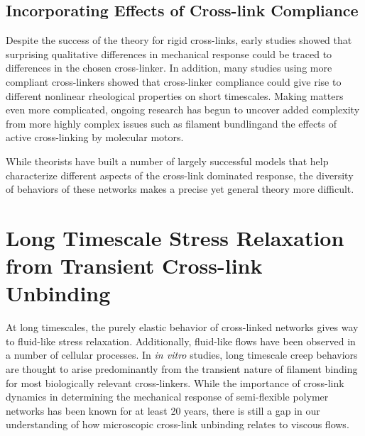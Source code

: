 \subsection{Incorporating Effects of Cross-link Compliance}

Despite the success of the theory for rigid cross-links, early studies showed that surprising qualitative differences in mechanical response could be traced to differences in the chosen cross-linker\cite{rheo_crosslinkcompare,rheo_crosslinkreview}.  In addition, many studies using more compliant cross-linkers showed that cross-linker compliance could give rise to different nonlinear rheological properties on short timescales\cite{rheo_crosslink_nonlin1,rheo_crosslink_nonlin2,rheo_crosslink_nonlin3,rheo_crosslink_notactin}. Making matters even more complicated, ongoing research has begun to uncover added complexity from more highly complex issues such as filament bundling\cite{theo_crosslinkslip2,model_massive}and the effects of active cross-linking by molecular motors\cite{rheo_active}.

While theorists have built a number of largely successful models that help characterize different aspects of the cross-link dominated response\cite{theo_nonaffine2,theo_floppy,theo_crosslinknonlinear}, the diversity of behaviors of these networks makes a precise yet general theory more difficult.

\section{Long Timescale Stress Relaxation from Transient Cross-link Unbinding}

At long timescales, the purely elastic behavior of cross-linked networks gives way to fluid-like stress relaxation. Additionally, fluid-like flows have been observed in a number of cellular processes\cite{cellmech_flows,cellmech_flows2,cellmech_flows3,rheo_fluid,rheo_fluid2,cell_rheo_exp}.  In {\em in vitro} studies, long timescale creep behaviors are thought to arise predominantly from the transient nature of filament binding for most biologically relevant cross-linkers\cite{rheo_crosslinkslip1,rheo_crosslinkslip2,rheo_crosslinkslip3,rheo_nonaffine}.  While the importance of cross-link dynamics in determining the mechanical response of semi-flexible polymer networks has been known for at least 20 years\cite{rheo_crosslinksmatter}, there is still a gap in our understanding of how microscopic cross-link unbinding relates to viscous flows. 

